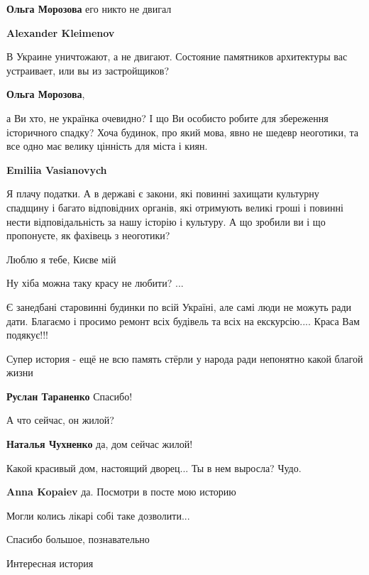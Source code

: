 \begin{itemize}
\begin{itemize}
\begin{itemize}
\textbf{Ольга Морозова} его никто не двигал

\textbf{Alexander Kleimenov} 

В Украине уничтожают, а не двигают. Состояние памятников архитектуры вас
устраивает, или вы из застройщиков?

\end{itemize} %

\textbf{Ольга Морозова}, 

а Ви хто, не українка очевидно? І що Ви особисто робите для збереження
історичного спадку? Хоча будинок, про який мова, явно не шедевр неоготики, та
все одно має велику цінність для міста і киян.

\textbf{Emiliia Vasianovych} 

Я плачу податки. А в державі є закони, які повинні захищати культурну спадщину
і багато відповідних органів, які отримують великі гроші і повинні нести
відповідальність за нашу історію і культуру. А що зробили ви і що пропонуєте,
як фахівець з неоготики?


\end{itemize} %

Люблю я тебе, Києве мій

Ну хіба можна таку красу не любити? ...

Є занедбані старовинні будинки по всій Україні, але самі люди не можуть ради
дати. Благаємо і просимо ремонт всіх будівель та всіх на екскурсію.... Краса Вам
подякує!!!

Супер история - ещё не всю память стёрли у народа ради непонятно какой благой жизни

\textbf{Руслан Тараненко} Спасибо!

А что сейчас, он жилой?

\textbf{Наталья Чухненко} да, дом сейчас жилой!

Какой красивый дом, настоящий дворец... Ты в нем выросла? Чудо.

\textbf{Anna Kopaiev} да.
Посмотри в посте мою историю

Могли колись лікарі собі таке дозволити...

Спасибо большое, познавательно

Интересная история


\end{itemize}
